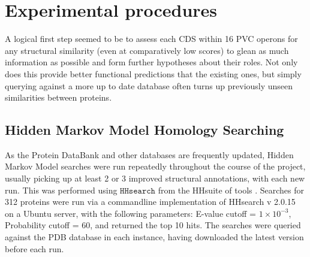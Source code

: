 \clearpage

\section{Experimental procedures}
	 A logical first step seemed to be to assess each CDS within 16 PVC operons for any structural similarity (even at comparatively low scores) to glean as much information as possible and form further hypotheses about their roles. Not only does this provide better functional predictions that the existing ones, but simply querying against a more up to date database often turns up previously unseen similarities between proteins.
	 
	
	\subsection{Hidden Markov Model Homology Searching}\label{hhresults}
	As the Protein DataBank and other databases are frequently updated, Hidden Markov Model searches were run repeatedly throughout the course of the project, usually picking up at least 2 or 3 improved structural annotations, with each new run. This was performed using $\mathtt{HHsearch}$ from the HHsuite of tools \citep{Remmert2012}. Searches for 312 proteins were run via a commandline implementation of HHsearch v 2.0.15 on a Ubuntu server, with the following parameters: E-value cutoff = $1\times10^{-3}$, Probability cutoff = 60, and returned the top 10 hits. The searches were queried against the PDB database in each instance, having downloaded the latest version before each run.
	

